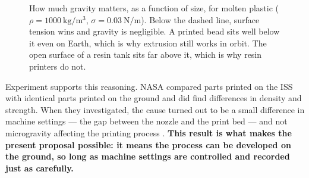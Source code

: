 \documentclass[11pt,a4paper]{article}
\begin{document}
\begin{figure}[htbp]
\centering
{}
\caption{How much gravity matters, as a function of size, for molten plastic
(\(\rho=\SI{1000}{\kilogram\per\metre\cubed}\),
\(\sigma=\SI{0.03}{\newton\per\metre}\)). Below the dashed line, surface tension
wins and gravity is negligible. A printed bead sits well below it even on Earth,
which is why extrusion still works in orbit. The open surface of a resin tank sits
far above it, which is why resin printers do not.}
\label{fig:bond}
\end{figure}

Experiment supports this reasoning. NASA compared parts printed on the ISS with identical parts printed on the ground
and did find differences in density and strength. When they investigated, the
cause turned out to be a small difference in machine settings --- the gap between
the nozzle and the print bed --- and not microgravity affecting the printing
process \cite{prater2019zerog}. \textbf{This result is what makes the present
proposal possible: it means the process can be developed on the ground, so long as
machine settings are controlled and recorded just as carefully.}
\end{document}
